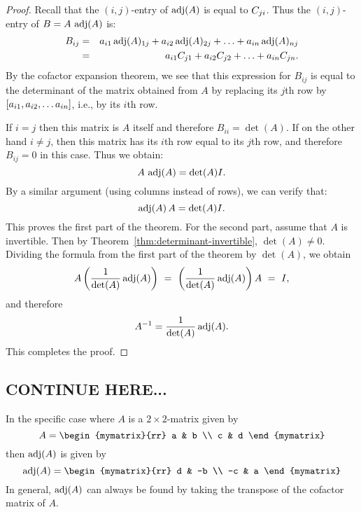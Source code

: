 \begin{proof}
  Recall that the $(i,j)$-entry of $\adj(A)$ is equal to
  $\cofactor{A}{ji}$.  Thus the $(i,j)$-entry of $B=A\,\adj(A)$ is:
  \begin{eqnarray*}
    B_{ij}
    &=& a_{i1}\adj(A)_{1j} + a_{i2}\adj(A)_{2j} + \ldots + a_{in}\adj(A)_{nj} \\
    &=& a_{i1}\cofactor{A}{j1} + a_{i2}\cofactor{A}{j2} + \ldots + a_{in}\cofactor{A}{jn}.
  \end{eqnarray*}
  By the cofactor expansion theorem, we see that this expression for
  $B_{ij}$ is equal to the determinant of the matrix obtained from $A$
  by replacing its $j$th row by $\mat{a_{i1}, a_{i2}, \dots a_{in}}$, 
  i.e., by its $i$th row.

  If $i=j$ then this matrix is $A$ itself and therefore
  $B_{ii}=\det(A)$. If on the other hand $i\neq j$, then this matrix
  has its $i$th row equal to its $j$th row, and therefore $B_{ij}=0$
  in this case. Thus we obtain:
  \begin{equation*}
    A \, \adj(A) = {\det(A)} I.
  \end{equation*}
  By a similar argument (using columns instead of rows), we can verify that:
  \begin{equation*}
    \adj(A)\,A = {\det(A)} I.
  \end{equation*}
  This proves the first part of the theorem. For the second part,
  assume that $A$ is invertible. Then by
  Theorem~\ref{thm:determinant-invertible}, $\det(A)\neq 0$. Dividing the
  formula from the first part of the theorem by $\det(A)$, we obtain
  \begin{equation*}
    A\paren{\frac{1}{\det(A)}\adj(A)} ~=~ \paren{\frac{1}{\det(A)}\adj(A)}A ~=~ I,
  \end{equation*}
  and therefore 
  \begin{equation*}
    A^{-1} = \frac{1}{\det(A)} \adj(A).
  \end{equation*}
  This completes the proof.
\end{proof}


\subsection{CONTINUE HERE...}

In the specific case where $A$ is a $2 \times 2$-matrix given by
\begin{equation*}
  A = \begin{mymatrix}{rr}
    a & b \\
    c & d
  \end{mymatrix}
\end{equation*}
then $\adj(A)$ is given by
\begin{equation*}
  \adj(A) = 
  \begin{mymatrix}{rr}
    d & -b \\
    -c & a
  \end{mymatrix}
\end{equation*}
In general, $\adj(A)$ can always be found by taking the
transpose of the cofactor matrix of $A$. 

